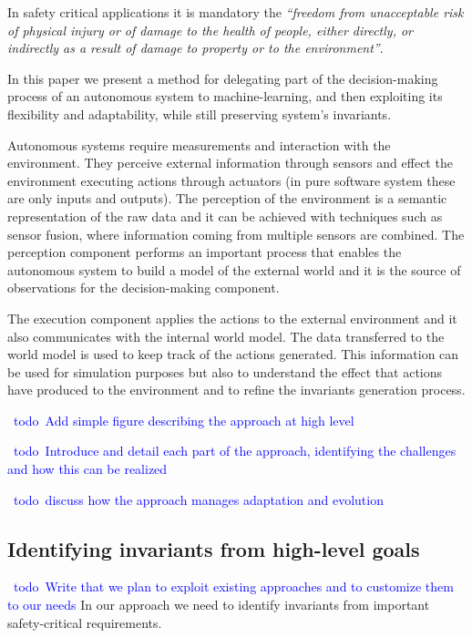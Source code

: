\documentclass[sigconf,review, anonymous]{acmart}
\newcommand{\todo}[1]{\textcolor{blue}{\ding{46}~{\sf todo}~#1}}
\begin{document}
In safety critical applications it is mandatory the \emph{``freedom from unacceptable risk of physical injury or of damage to the health of people, either directly, or indirectly as a result of damage to property or to the environment''}.

In this paper we present a method for delegating part of the decision-making process of an autonomous system to machine-learning, and then exploiting its flexibility and adaptability, while still preserving system's invariants. 

Autonomous systems require measurements and interaction with the environment.  They perceive external information through sensors and effect the environment executing actions through actuators (in pure software system these are only inputs and outputs).  The perception of the environment is a semantic representation of the raw data and it can be achieved with techniques such as sensor fusion, where information coming from multiple sensors are combined. The perception component performs an important process that enables the autonomous system to build a model of the external world and it is the source of observations for the decision-making component.

The execution component applies the actions to the external environment and it also communicates with the internal world model. The data transferred to the world model is used to keep track of the actions generated. This information can be used for simulation purposes but also to understand the effect that actions have produced to the environment and to refine the invariants generation process.

\todo{Add simple figure describing the approach at high level}

\todo{Introduce and detail each part of the approach, identifying the challenges and how this can be realized}

\todo{discuss how the approach manages adaptation and evolution}

\subsection{Identifying invariants from high-level goals}

\todo{Write that we plan to exploit existing approaches and to customize them to our needs}
In our approach we need to identify invariants from important safety-critical requirements. 
\end{document}
